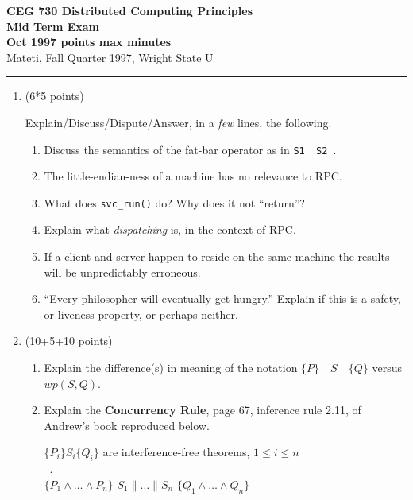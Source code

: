 \documentclass[12pt]{article}
\newcommand{\fat}{\framebox[1mm]{\rule{0mm}{2mm}}}
\newcommand{\RPC}{RPC}
\newcommand{\co}{{\bf co}}
\newcommand{\oc}{{\bf oc}}
\newcommand{\zand}{\wedge}
\begin{document}
{\bf CEG 
\large \bf 730 Distributed Computing Principles\\[5pt]
\large Mid Term Exam\\[10pt]
Oct 1997  points max  minutes\\
}
\bigskip
{Mateti,  Fall Quarter 1997, Wright State U}\\[-5pt]
\hrule

\begin{enumerate}

\item (6*5 points)

Explain/Discuss/Dispute/Answer, in a {\em few} lines, the following.

\begin{enumerate}

\item
Discuss the semantics of the fat-bar operator as in {\tt S1 \fat\ S2 }.

\item
The little-endian-ness of a machine has no relevance to \RPC.

\item
What does \verb|svc_run()| do?  Why does it not ``return''?

\item
Explain what {\em dispatching} is, in the context of \RPC.

\item
If a client and server happen to reside on the same machine the
results will be unpredictably erroneous.

\item
``Every philosopher will eventually get hungry.''  Explain
if this is a safety, or liveness property, or perhaps neither.
\end{enumerate}


\item (10+5+10 points)
\begin{enumerate}
\item
Explain the difference(s) in meaning of the notation
$ \{ P \} \quad S \quad \{ Q \} $
versus
$ wp(S, Q) $.

\item
Explain the {\bf Concurrency Rule}, page 67, inference rule 2.11, of
Andrew's book reproduced below.\\

\begin{centering}
\{$P_i\} S_i \{Q_i\}$ are interference-free theorems, $1 \leq i \leq
n$\\[-8pt]
~.\hrulefill\\[-4pt]
$\{P_1 \zand \ldots \zand P_n\}$
\quad\co\quad $S_1 \parallel \ldots \parallel S_n$ \quad\oc\quad
$\{Q_1 \zand \ldots \zand Q_n\}$\par
\end{centering}


\end{enumerate}
\end{enumerate}
\end{document}
